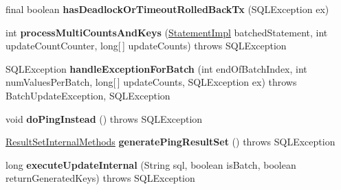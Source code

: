 \begin{DoxyCompactItemize}
\mbox{\label{classcom_1_1mysql_1_1cj_1_1jdbc_1_1_statement_impl_a5674003fcd332a1ac38d549b0b4c806e}} 
final boolean {\bfseries has\+Deadlock\+Or\+Timeout\+Rolled\+Back\+Tx} (S\+Q\+L\+Exception ex)
\item 
\mbox{\label{classcom_1_1mysql_1_1cj_1_1jdbc_1_1_statement_impl_a1b7f947e15b58dbe233271842c0b6175}} 
int {\bfseries process\+Multi\+Counts\+And\+Keys} (\mbox{\hyperlink{classcom_1_1mysql_1_1cj_1_1jdbc_1_1_statement_impl}{Statement\+Impl}} batched\+Statement, int update\+Count\+Counter, long\mbox{[}$\,$\mbox{]} update\+Counts)  throws S\+Q\+L\+Exception 
\item 
\mbox{\label{classcom_1_1mysql_1_1cj_1_1jdbc_1_1_statement_impl_a2d99664aa399918797c4238891f59fba}} 
S\+Q\+L\+Exception {\bfseries handle\+Exception\+For\+Batch} (int end\+Of\+Batch\+Index, int num\+Values\+Per\+Batch, long\mbox{[}$\,$\mbox{]} update\+Counts, S\+Q\+L\+Exception ex)  throws Batch\+Update\+Exception, S\+Q\+L\+Exception 
\item 
\mbox{\label{classcom_1_1mysql_1_1cj_1_1jdbc_1_1_statement_impl_a1d04ca76ab91fea81ce3a67550de429b}} 
void {\bfseries do\+Ping\+Instead} ()  throws S\+Q\+L\+Exception 
\item 
\mbox{\label{classcom_1_1mysql_1_1cj_1_1jdbc_1_1_statement_impl_ad3d32ab94e514770f0bd9517bfd21221}} 
\mbox{\hyperlink{interfacecom_1_1mysql_1_1cj_1_1jdbc_1_1result_1_1_result_set_internal_methods}{Result\+Set\+Internal\+Methods}} {\bfseries generate\+Ping\+Result\+Set} ()  throws S\+Q\+L\+Exception 
\item 
\mbox{\label{classcom_1_1mysql_1_1cj_1_1jdbc_1_1_statement_impl_aa3b2b9e62f16d87eb9f3f877a1b12928}} 
long {\bfseries execute\+Update\+Internal} (String sql, boolean is\+Batch, boolean return\+Generated\+Keys)  throws S\+Q\+L\+Exception 
\item 
\mbox{\label{classcom_1_1mysql_1_1cj_1_1jdbc_1_1_statement_impl_a059f84ba3f95ea77a0a3c764e3ea00f2}} 

\end{DoxyCompactItemize}
